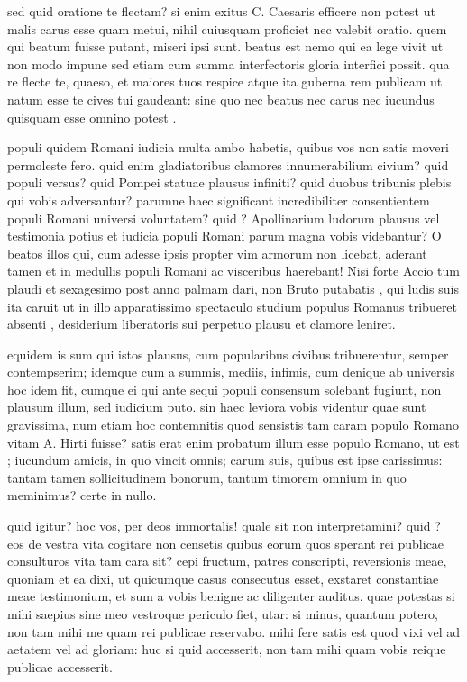  sed quid oratione te flectam? si enim exitus C. Caesaris efficere non potest ut malis carus esse quam metui, nihil cuiusquam proficiet nec valebit oratio. quem qui beatum fuisse putant, miseri ipsi sunt. beatus est nemo qui ea lege vivit ut non modo impune sed etiam cum summa interfectoris gloria interfici possit. qua re flecte te, quaeso, et maiores tuos respice atque ita guberna rem publicam ut natum esse te cives tui gaudeant: sine quo nec beatus nec carus nec iucundus quisquam esse omnino potest .

 populi quidem Romani iudicia multa ambo habetis, quibus vos non satis moveri permoleste fero. quid enim gladiatoribus clamores innumerabilium civium? quid populi versus? quid Pompei statuae plausus infiniti? quid duobus tribunis plebis qui vobis adversantur? parumne haec significant incredibiliter consentientem populi Romani universi voluntatem? quid ? Apollinarium ludorum plausus vel testimonia potius et iudicia populi Romani parum magna vobis videbantur? O beatos illos qui, cum adesse ipsis propter vim armorum non licebat, aderant tamen et in medullis populi Romani ac visceribus haerebant! Nisi forte Accio tum plaudi et sexagesimo post anno palmam dari, non Bruto putabatis , qui ludis suis ita caruit ut in illo apparatissimo spectaculo studium populus Romanus tribueret absenti , desiderium liberatoris sui perpetuo plausu et clamore leniret.

 equidem is sum qui istos plausus, cum popularibus civibus tribuerentur, semper contempserim; idemque cum a summis, mediis, infimis, cum denique ab universis hoc idem fit, cumque ei qui ante sequi populi consensum solebant fugiunt, non plausum illum, sed iudicium puto. sin haec leviora vobis videntur quae sunt gravissima, num etiam hoc contemnitis quod sensistis tam caram populo Romano vitam A. Hirti fuisse? satis erat enim probatum illum esse populo Romano, ut est ; iucundum amicis, in quo vincit omnis; carum suis, quibus est ipse carissimus: tantam tamen sollicitudinem bonorum, tantum timorem omnium in quo meminimus? certe in nullo.

 quid igitur? hoc vos, per deos immortalis! quale sit non interpretamini? quid ? eos de vestra vita cogitare non censetis quibus eorum quos sperant rei publicae consulturos vita tam cara sit? cepi fructum, patres conscripti, reversionis meae, quoniam et ea dixi, ut quicumque casus consecutus esset, exstaret constantiae meae testimonium, et sum a vobis benigne ac diligenter auditus. quae potestas si mihi saepius sine meo vestroque periculo fiet, utar: si minus, quantum potero, non tam mihi me quam rei publicae reservabo. mihi fere satis est quod vixi vel ad aetatem vel ad gloriam: huc si quid accesserit, non tam mihi quam vobis reique publicae accesserit.
